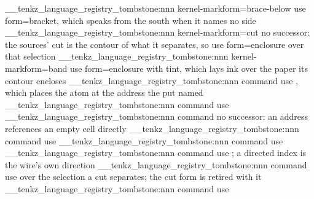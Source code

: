 \__tenkz_language_registry_tombstone:nnn {kernel-mark}{form=brace-below}
  {use form=bracket, which speaks from the south when it names no side}
\__tenkz_language_registry_tombstone:nnn {kernel-mark}{form=cut}
  {no successor: the sources' cut is the contour of what it separates,
    so use form=enclosure over that selection}
\__tenkz_language_registry_tombstone:nnn {kernel-mark}{form=band}
  {use form=enclosure with tint, which lays ink over the paper its contour
    encloses}
%
\__tenkz_language_registry_tombstone:nnn {command}{\tnput}
  {use \tn[at=(r,c)], which places the atom at the address the put named}
\__tenkz_language_registry_tombstone:nnn {command}{\tnsite}
  {use \tn[at=(r,c)]}
\__tenkz_language_registry_tombstone:nnn {command}{\tnghost}
  {no successor: an address references an empty cell directly}
\__tenkz_language_registry_tombstone:nnn {command}{\tnjoin}
  {use \tnwire}
\__tenkz_language_registry_tombstone:nnn {command}{\tnedge}
  {use \tnwire}
\__tenkz_language_registry_tombstone:nnn {command}{\tnarrow}
  {use \tnwire[dir=to]; a directed index is the wire's own direction}
\__tenkz_language_registry_tombstone:nnn {command}{\tncut}
  {use \tnmark[form=enclosure] over the selection a cut separates; the cut
    form is retired with it}
\__tenkz_language_registry_tombstone:nnn {command}{\tnregion}
  {use \tnmark[form=enclosure]}
